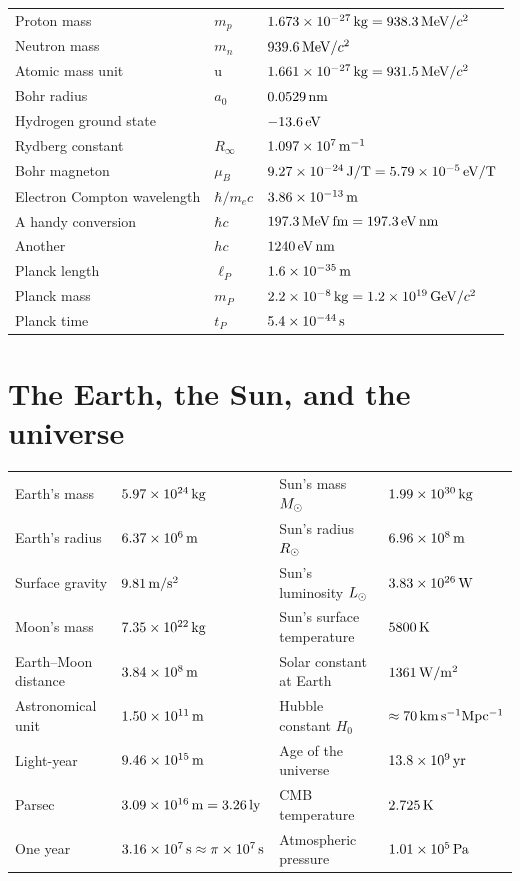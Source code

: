 \begin{center}
\begin{tabular}{@{}l l l@{}}
Proton mass & $m_p$ & $1.673\times10^{-27}\,\mathrm{kg} = 938.3\,\mathrm{MeV}/c^2$\\
Neutron mass & $m_n$ & $939.6\,\mathrm{MeV}/c^2$\\
Atomic mass unit & u & $1.661\times10^{-27}\,\mathrm{kg} = 931.5\,\mathrm{MeV}/c^2$\\
\midrule
Bohr radius & $a_0$ & $0.0529\,\mathrm{nm}$\\
Hydrogen ground state & & $-13.6\,\mathrm{eV}$\\
Rydberg constant & $R_\infty$ & $1.097\times10^{7}\,\mathrm{m^{-1}}$\\
Bohr magneton & $\mu_B$ & $9.27\times10^{-24}\,\mathrm{J/T} = 5.79\times10^{-5}\,\mathrm{eV/T}$\\
Electron Compton wavelength & $\hbar/m_ec$ & $3.86\times10^{-13}\,\mathrm{m}$\\
A handy conversion & $\hbar c$ & $197.3\,\mathrm{MeV\,fm} = 197.3\,\mathrm{eV\,nm}$\\
Another & $hc$ & $1240\,\mathrm{eV\,nm}$\\
\midrule
Planck length & $\ell_P$ & $1.6\times10^{-35}\,\mathrm{m}$\\
Planck mass & $m_P$ & $2.2\times10^{-8}\,\mathrm{kg} = 1.2\times10^{19}\,\mathrm{GeV}/c^2$\\
Planck time & $t_P$ & $5.4\times10^{-44}\,\mathrm{s}$\\
\bottomrule
\end{tabular}
\end{center}

\section*{The Earth, the Sun, and the universe}

\begin{center}
\small
\renewcommand{\arraystretch}{1.2}
\begin{tabular}{@{}l l@{\qquad}l l@{}}
\toprule
Earth's mass & $5.97\times10^{24}\,\mathrm{kg}$ & Sun's mass $M_{\odot}$ & $1.99\times10^{30}\,\mathrm{kg}$\\
Earth's radius & $6.37\times10^{6}\,\mathrm{m}$ & Sun's radius $R_{\odot}$ & $6.96\times10^{8}\,\mathrm{m}$\\
Surface gravity & $9.81\,\mathrm{m/s^2}$ & Sun's luminosity $L_{\odot}$ & $3.83\times10^{26}\,\mathrm{W}$\\
Moon's mass & $7.35\times10^{22}\,\mathrm{kg}$ & Sun's surface temperature & $5800\,\mathrm{K}$\\
Earth--Moon distance & $3.84\times10^{8}\,\mathrm{m}$ & Solar constant at Earth & $1361\,\mathrm{W/m^2}$\\
Astronomical unit & $1.50\times10^{11}\,\mathrm{m}$ & Hubble constant $H_0$ & $\approx70\,\mathrm{km\,s^{-1}Mpc^{-1}}$\\
Light-year & $9.46\times10^{15}\,\mathrm{m}$ & Age of the universe & $13.8\times10^{9}\,\mathrm{yr}$\\
Parsec & $3.09\times10^{16}\,\mathrm{m} = 3.26\,\mathrm{ly}$ & CMB temperature & $2.725\,\mathrm{K}$\\
One year & $3.16\times10^{7}\,\mathrm{s}\approx\pi\times10^7\,\mathrm{s}$ & Atmospheric pressure & $1.01\times10^{5}\,\mathrm{Pa}$\\
\bottomrule
\end{tabular}
\end{center}

